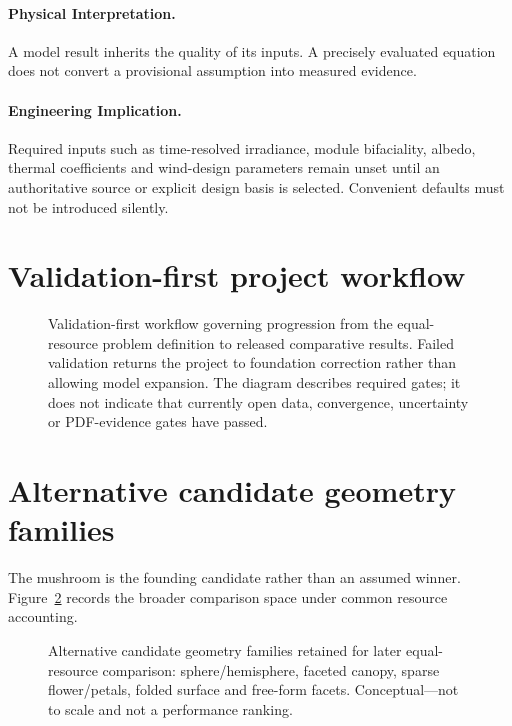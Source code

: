 \documentclass[11pt,a4paper]{article}
\begin{document}
\paragraph{Physical Interpretation.}
A model result inherits the quality of its inputs. A precisely evaluated equation does not convert a provisional assumption into measured evidence.

\paragraph{Engineering Implication.}
Required inputs such as time-resolved irradiance, module bifaciality, albedo, thermal coefficients and wind-design parameters remain unset until an authoritative source or explicit design basis is selected. Convenient defaults must not be introduced silently.


\section{Validation-first project workflow}
\begin{figure}[htbp]
\centering

\caption{Validation-first workflow governing progression from the equal-resource problem definition to released comparative results. Failed validation returns the project to foundation correction rather than allowing model expansion. The diagram describes required gates; it does not indicate that currently open data, convergence, uncertainty or PDF-evidence gates have passed.}
\label{fig:validation-flow}
\end{figure}


\section{Alternative candidate geometry families}
The mushroom is the founding candidate rather than an assumed winner. Figure~\ref{fig:candidate-families} records the broader comparison space under common resource accounting.

\begin{figure}[htbp]
\centering

\caption{Alternative candidate geometry families retained for later equal-resource comparison: sphere/hemisphere, faceted canopy, sparse flower/petals, folded surface and free-form facets. Conceptual---not to scale and not a performance ranking.}
\label{fig:candidate-families}
\end{figure}
\end{document}
